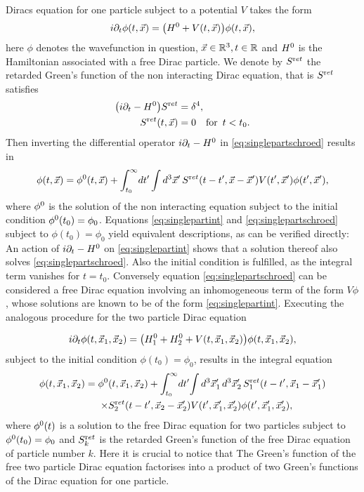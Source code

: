 \documentclass[b5paper,draft,openbib,12pt]{memoir}
\begin{document}
Diracs equation for one particle subject to a potential \(V\) takes the form
\begin{equation}
	i \partial_t \phi(t,{\vec{x}}) = \big( H^{0} + V(t,{\vec{x}}) \big) \phi(t,{\vec{x}}),
	\label{eq:singlepartschroed}
\end{equation}
here \(\phi\) denotes the wavefunction in question, \({\vec{x}}\in\mathbb{R}^3, t\in\mathbb{R}\)
and \(H^{0}\) is the Hamiltonian associated with a free Dirac particle.
We denote by \(S^{\textup ret}\) the retarded Green's function of the non interacting Dirac equation,
that is \(S^{\textup ret}\) satisfies
\begin{align}\label{eq:schroedgreensfn}
  \big( i \partial_t - H^{0} \big) S^{\textup ret} &= \delta^4,\\
  S^{\textup ret}(t,{\vec{x}}) &= 0 \quad \text{for }\, t< t_0.
\end{align}
Then inverting the differential operator \(i\partial_t -H^{0}\) in  \eqref{eq:singlepartschroed}
results in 
\begin{equation}
	\phi(t,{\vec{x}}) = \phi^{0}(t,{\vec{x}}) + \int_{t_0}^\infty \! dt' \int d^3 {\vec{x}}' \, S^{\textup ret}(t-t',{\vec{x}}-{\vec{x}}') V(t',{\vec{x}}') \phi(t',{\vec{x}}'),
	\label{eq:singlepartint}
\end{equation}
where $\phi^{0}$ 
is the solution of the non interacting equation subject to the 
initial condition \(\phi^{0}(t_0)=\phi_0\). 
Equations \eqref{eq:singlepartint} and \eqref{eq:singlepartschroed} subject to 
\(\phi(t_0)=\phi_0\) yield equivalent 
descriptions, as can be verified directly: An action of \(i\partial_t -H^{0}\) on 
\eqref{eq:singlepartint} shows that a solution thereof also solves \eqref{eq:singlepartschroed}.
Also the initial condition is fulfilled, as the integral term vanishes for \(t=t_0\).
Conversely equation \eqref{eq:singlepartschroed} can be considered a free Dirac equation 
involving an inhomogeneous term of the form \(V \phi\), whose solutions are known to be
of the form \eqref{eq:singlepartint}.
Executing the analogous procedure for the two particle Dirac equation

\begin{equation}
	i \partial_t \phi(t,{\vec{x}}_1,{\vec{x}}_2) = \big(H_1^{0} + H_2^{0} + V(t,{\vec{x}}_1,{\vec{x}}_2)\big) \phi(t,{\vec{x}}_1,{\vec{x}}_2),
	\label{eq:twopartschroed}
\end{equation}
subject to the initial condition  \(\phi(t_0)=\phi_0\), 
results in the integral equation
\begin{align}
	\phi(t,{\vec{x}}_1,{\vec{x}}_2) = \phi^{0}&(t,{\vec{x}}_1,{\vec{x}}_2) + \int_{t_0}^\infty \! dt' \! \int d^3 {\vec{x}}_1'\,  d^3 {\vec{x}}_2'\, S_1^{\textup ret}(t-t',{\vec{x}}_1-{\vec{x}}_1') \nonumber\\
	\times&S_2^{\textup ret}(t-t',{\vec{x}}_2-{\vec{x}}_2') V(t',{\vec{x}}_1',{\vec{x}}_2') \phi(t',{\vec{x}}_1',{\vec{x}}_2'),
	\label{eq:twopartschroedint}
\end{align}
where 
$\phi^{0}(t)$ is a solution to the free Dirac equation for two particles subject
to \(\phi^{0} (t_0)=\phi_0\) and \(S_k^{\textup ret}\) is the retarded Green's function
of the free Dirac equation of particle number \(k\). Here it is crucial to notice that
The Green's function of the free two particle Dirac equation factorises into a product 
of two Green's functions of the Dirac equation for one particle.
\end{document}
